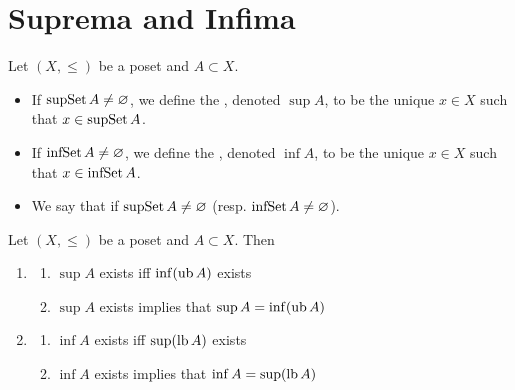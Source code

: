 \documentclass{book}
\begin{document}
	
	
	
	
	
	
	
	
	
	
	
	
	
	
	
	
	
	
	
	
	
	
	
	
	
	
	
	
	
	
	
	
	
	
	
	
	\newpage
	\section{Suprema and Infima}
	
	\begin{defn} 
		Let $(X, \leq)$ be a poset and $A \subset X$. 
		\begin{itemize}
			\item If $\operatorname{supSet} A \neq \varnothing$, we define the , denoted $\sup A$, to be the unique $x \in X$ such that $x \in \operatorname{supSet} A$.  
			\item If $\operatorname{infSet} A \neq \varnothing$, we define the , denoted $\inf A$, to be the unique $x \in X$ such that $x \in \operatorname{infSet} A$.
			\item We say that  if $\operatorname{supSet} A \neq \varnothing$ (resp. $\operatorname{infSet} A \neq \varnothing$). 
		\end{itemize}
	\end{defn}
	
	\begin{ex} 
		Let $(X, \leq)$ be a poset and $A \subset X$. Then 
		\begin{enumerate}
			\item 
			\begin{enumerate}
				\item $\sup A$ exists iff $\inf (\operatorname{ub} A)$ exists
				\item $\sup A$ exists implies that $\sup A = \inf (\operatorname{ub} A)$ 
			\end{enumerate}
			\item 
			\begin{enumerate}
				\item $\inf A$ exists iff $\sup (\operatorname{lb} A)$ exists
				\item $\inf A$ exists implies that $\inf A = \sup (\operatorname{lb} A)$ 
			\end{enumerate}
		\end{enumerate}
	\end{ex}
	
\end{document}
